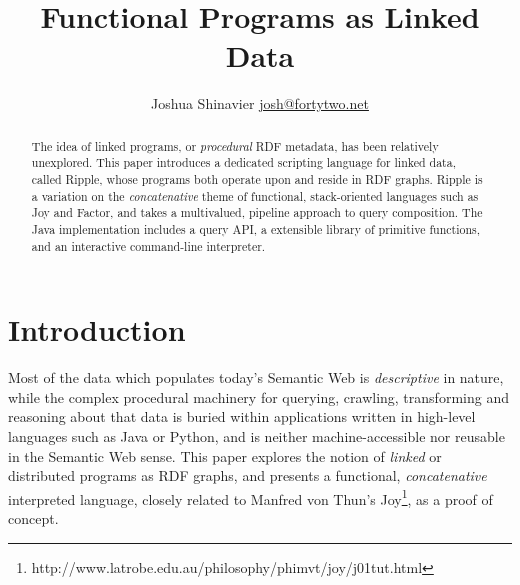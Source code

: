 \documentclass[runningheads]{llncs}
\begin{document}
\mainmatter  %


\title{Functional Programs as Linked Data}


%
%
\author{
Joshua Shinavier
\newline
\url{josh@fortytwo.net}}
%


%
%

\maketitle


\begin{abstract}
The idea of linked programs, or \textit{procedural} RDF metadata, has been relatively unexplored.  This paper introduces a dedicated scripting language for linked data, called Ripple, whose programs both operate upon and reside in RDF graphs.  Ripple is a variation on the \textit{concatenative} theme of functional, stack-oriented languages such as Joy and Factor, and takes a multivalued, pipeline approach to query composition.  The Java implementation includes a query API, a extensible library of primitive functions, and an interactive command-line interpreter.
\end{abstract}

\section{Introduction}
Most of the data which populates today's Semantic Web is \textit{descriptive} in nature, while the complex procedural machinery for querying, crawling, transforming and reasoning about that data is buried within applications written in high-level languages such as Java or Python, and is neither machine-accessible nor reusable in the Semantic Web sense.  This paper explores the notion of \textit{linked} or distributed programs as RDF graphs, and presents a functional, \textit{concatenative} interpreted language, closely related to Manfred von Thun's Joy\footnote{http://www.latrobe.edu.au/philosophy/phimvt/joy/j01tut.html}, as a proof of concept.
\end{document}
